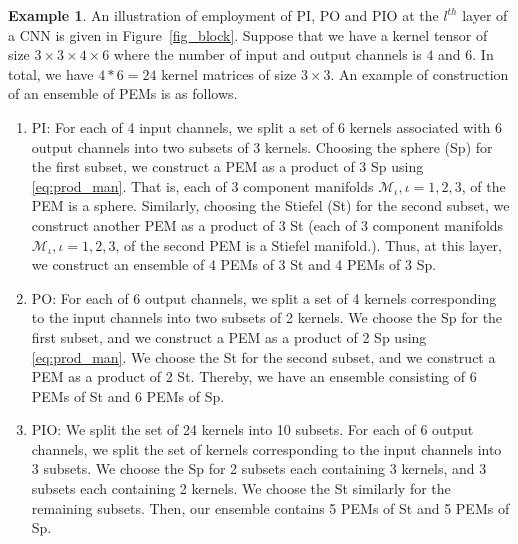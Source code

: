 \documentclass[10pt,journal,compsoc]{IEEEtran}
\theoremstyle{definition}
\theoremstyle{definition}
\newtheorem{example}[theorem]{Example}
\theoremstyle{remark}
\theoremstyle{remark}
\theoremstyle{remark}
\begin{document}
   
\begin{example}
An illustration of employment of PI, PO and PIO at the $l^{th}$ layer of a CNN is given in Figure~\ref{fig_block}. Suppose that we have a kernel tensor of size $3 \times 3 \times 4 \times 6$ where the number of input and output channels is $4$ and $6$. In total, we have ${4*6=24}$ kernel matrices of size $3 \times 3$. An example of construction of an ensemble of PEMs is as follows. 
\begin{enumerate}[leftmargin=*] %
\item PI: For each of 4 input channels, we split a set of 6 kernels associated with 6 output channels into two subsets of 3 kernels. Choosing the sphere (Sp) for the first subset, we construct a PEM  as a product of 3 Sp using \eqref{eq:prod_man}. That is, each of 3 component manifolds ${\mathcal{M}_{\iota}}, {\iota  = 1,2,3}$, of the PEM is a sphere. Similarly, choosing the Stiefel (St) for the second subset, we construct another PEM as a product of 3 St (each of 3 component manifolds ${\mathcal{M}_{\iota}}, \iota  = 1,2,3$, of the second PEM is a Stiefel manifold.). Thus, at this layer, we construct an ensemble of 4 PEMs of 3 St and 4 PEMs of 3 Sp.
\item PO: For each of 6 output channels, we split a set of 4 kernels corresponding to the input channels into two subsets of 2 kernels. We choose the Sp for the first subset, and we construct a PEM as a product of 2 Sp using \eqref{eq:prod_man}. We choose the St for the second subset, and we construct a PEM as a product of 2 St. Thereby, we have an ensemble consisting of 6 PEMs of St and 6 PEMs of Sp.
\item PIO: We split the set of 24 kernels into 10 subsets. For each of 6 output channels, we split the set of kernels corresponding to the input channels into 3 subsets. We choose the Sp for 2 subsets each containing 3 kernels, and 3 subsets each containing 2 kernels. We choose the St similarly for the remaining subsets. Then, our ensemble contains 5 PEMs of St and 5 PEMs of Sp.
\end{enumerate}
\end{example}
\end{document}
